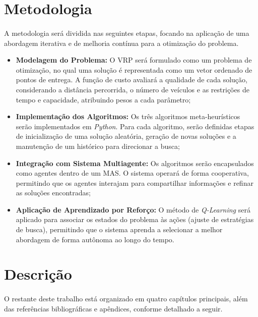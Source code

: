 \section{Metodologia}
\label{sec:metodologia}

\paragraph{}A metodologia será dividida nas seguintes etapas, focando na aplicação de uma abordagem iterativa e de melhoria contínua para a otimização do problema.

\begin{itemize}
    \item \textbf{Modelagem do Problema:} O VRP será formulado como um problema de otimização, no qual uma solução é representada como um vetor ordenado de pontos de entrega. A função de custo avaliará a qualidade de cada solução, considerando a distância percorrida, o número de veículos e as restrições de tempo e capacidade, atribuindo pesos a cada parâmetro;
    \item \textbf{Implementação dos Algoritmos:} Os três algoritmos meta-heurísticos serão implementados em \textit{Python}. Para cada algoritmo, serão definidas etapas de inicialização de uma solução aleatória, geração de novas soluções e a manutenção de um histórico para direcionar a busca;
    \item \textbf{Integração com Sistema Multiagente:} Os algoritmos serão encapsulados como agentes dentro de um MAS. O sistema operará de forma cooperativa, permitindo que os agentes interajam para compartilhar informações e refinar as soluções encontradas;
    \item \textbf{Aplicação de Aprendizado por Reforço:} O método de \textit{Q-Learning} será aplicado para associar os estados do problema às ações (ajuste de estratégias de busca), permitindo que o sistema aprenda a selecionar a melhor abordagem de forma autônoma ao longo do tempo.
\end{itemize}



\section{Descrição}
\label{sec:descricao}

\paragraph{}O restante deste trabalho está organizado em quatro capítulos principais, além das referências bibliográficas e apêndices, conforme detalhado a seguir.

